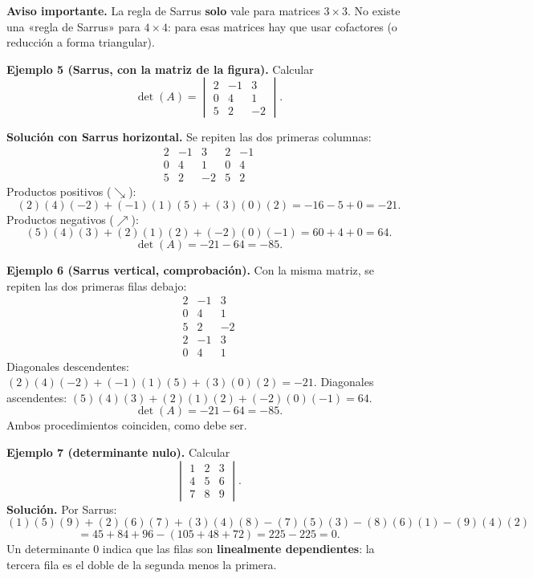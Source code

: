 \documentclass[12pt, letterpaper]{article}
\newcommand{\mwdet}[1]{\ensuremath{\begin{vmatrix}#1\end{vmatrix}}}
\begin{document}
\begin{cuadroteoria}
  \small
  \textbf{Aviso importante.} La regla de Sarrus \textbf{solo} vale para
  matrices $3\times3$. No existe una «regla de Sarrus» para $4\times4$: para
  esas matrices hay que usar cofactores (o reducción a forma triangular).
\end{cuadroteoria}

\begin{cuadrosolucion}
  \small
  \textbf{Ejemplo 5 (Sarrus, con la matriz de la figura).} Calcular
  \[
    \det(A)=\mwdet{2&-1&3\\0&4&1\\5&2&-2}.
  \]

  \medskip
  \textbf{Solución con Sarrus horizontal.} Se repiten las dos primeras
  columnas:
  \[
    \begin{array}{ccc|cc}
      2&-1&3&2&-1\\
      0&4&1&0&4\\
      5&2&-2&5&2
    \end{array}
  \]
  Productos positivos ($\searrow$):
  \[
    (2)(4)(-2)+(-1)(1)(5)+(3)(0)(2)
    =-16-5+0=-21.
  \]
  Productos negativos ($\nearrow$):
  \[
    (5)(4)(3)+(2)(1)(2)+(-2)(0)(-1)
    =60+4+0=64.
  \]
  \[
    \det(A)=-21-64=-85.
  \]
\end{cuadrosolucion}

\begin{cuadrosolucion}
  \small
  \textbf{Ejemplo 6 (Sarrus vertical, comprobación).} Con la misma matriz,
  se repiten las dos primeras filas debajo:
  \[
    \begin{array}{ccc}
      2&-1&3\\
      0&4&1\\
      5&2&-2\\
      \hline
      2&-1&3\\
      0&4&1
    \end{array}
  \]
  Diagonales descendentes:
  $(2)(4)(-2)+(-1)(1)(5)+(3)(0)(2)=-21$.
  \quad Diagonales ascendentes:
  $(5)(4)(3)+(2)(1)(2)+(-2)(0)(-1)=64$.
  \[
    \det(A)=-21-64=-85.
  \]
  Ambos procedimientos coinciden, como debe ser.
\end{cuadrosolucion}

\begin{cuadrosolucion}
  \small
  \textbf{Ejemplo 7 (determinante nulo).} Calcular
  \[
    \mwdet{1&2&3\\4&5&6\\7&8&9}.
  \]
  \textbf{Solución.} Por Sarrus:
  \[
    (1)(5)(9)+(2)(6)(7)+(3)(4)(8)
    -(7)(5)(3)-(8)(6)(1)-(9)(4)(2)
  \]
  \[
    =45+84+96-(105+48+72)=225-225=0.
  \]
  Un determinante $0$ indica que las filas son \textbf{linealmente
  dependientes}: la tercera fila es el doble de la segunda menos la primera.
\end{cuadrosolucion}
\end{document}
